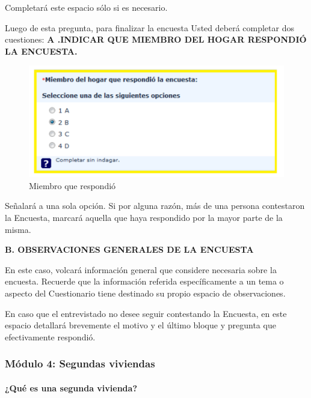 \documentclass[
  openany]{book}
\begin{document}
Completará este espacio sólo si es necesario.

Luego de esta pregunta, para finalizar la encuesta Usted deberá completar dos cuestiones: \textbf{A .INDICAR QUE MIEMBRO DEL HOGAR RESPONDIÓ LA ENCUESTA.}

\begin{figure}

{\centering \includegraphics[width=1\linewidth]{imagenes/figura6-64} 

}

\caption{Miembro que respondió}\label{fig:respues9}
\end{figure}

Señalará a una sola opción. Si por alguna razón, más de una persona contestaron la Encuesta, marcará aquella que haya respondido por la mayor parte de la misma.

\textbf{B. OBSERVACIONES GENERALES DE LA ENCUESTA}

En este caso, volcará información general que considere necesaria sobre la encuesta. Recuerde que la información referida específicamente a un tema o aspecto del Cuestionario tiene destinado su propio espacio de observaciones.

En caso que el entrevistado no desee seguir contestando la Encuesta, en este espacio detallará brevemente el motivo y el último bloque y pregunta que efectivamente respondió.

\hypertarget{muxf3dulo-4-segundas-viviendas}{%
\subsubsection{Módulo 4: Segundas viviendas}\label{muxf3dulo-4-segundas-viviendas}}

\hypertarget{quuxe9-es-una-segunda-vivienda}{%
\paragraph{¿Qué es una segunda vivienda?}\label{quuxe9-es-una-segunda-vivienda}}
\end{document}
